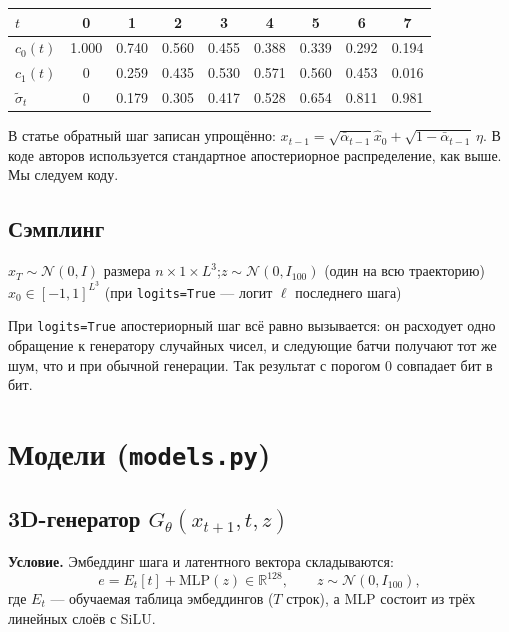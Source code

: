 \documentclass[11pt,a4paper]{article}
\newcommand{\code}[1]{\texttt{#1}}
\newcommand{\abar}{\bar\alpha}
\begin{document}
\begin{center}
\small
\begin{tabular}{@{}lcccccccc@{}}
\toprule
$t$ & 0 & 1 & 2 & 3 & 4 & 5 & 6 & 7 \\
\midrule
$c_0(t)$ & 1.000 & 0.740 & 0.560 & 0.455 & 0.388 & 0.339 & 0.292 & 0.194 \\
$c_1(t)$ & 0 & 0.259 & 0.435 & 0.530 & 0.571 & 0.560 & 0.453 & 0.016 \\
$\tilde\sigma_t$ & 0 & 0.179 & 0.305 & 0.417 & 0.528 & 0.654 & 0.811 & 0.981 \\
\bottomrule
\end{tabular}
\end{center}

В статье обратный шаг записан упрощённо: $x_{t-1}=\sqrt{\abar_{t-1}}\hat x_0+\sqrt{1-\abar_{t-1}}\,\eta$.
В коде авторов используется стандартное апостериорное распределение, как выше. Мы следуем коду.

\subsection{Сэмплинг}
\begin{algorithm}[H]
\caption{Инференс (\code{Diffusion.sample})}
$x_T\sim\mathcal N(0,I)$ размера $n\times1\times L^3$;\quad $z\sim\mathcal N(0,I_{100})$ (один на всю траекторию)\;
\Return $x_0\in[-1,1]^{L^3}$ (при \code{logits=True} — логит $\ell$ последнего шага)\;
\end{algorithm}
При \code{logits=True} апостериорный шаг всё равно вызывается: он расходует одно обращение к генератору
случайных чисел, и следующие батчи получают тот же шум, что и при обычной генерации. Так результат с
порогом 0 совпадает бит в бит.

\section{Модели (\code{models.py})}

\subsection{3D-генератор $G_\theta(x_{t+1}, t, z)$}
\textbf{Условие.} Эмбеддинг шага и латентного вектора складываются:
\[
  e = E_t[t] + \mathrm{MLP}(z)\in\mathbb R^{128},\qquad z\sim\mathcal N(0,I_{100}),
\]
где $E_t$ — обучаемая таблица эмбеддингов ($T$ строк), а MLP состоит из трёх линейных слоёв с SiLU.
\end{document}
